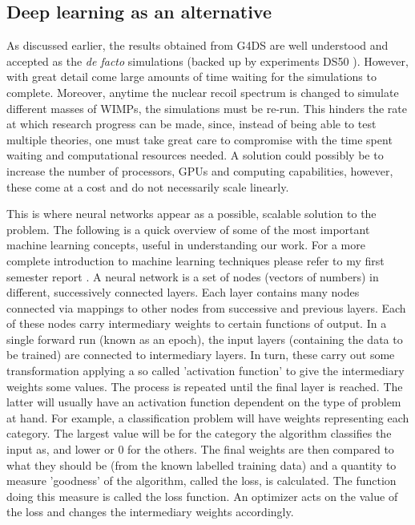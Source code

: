 \documentclass[11pt]{article} %
\begin{document}
\subsection{Deep learning as an alternative}
As discussed earlier, the results obtained from G4DS are well understood and accepted as the \textit{de facto} simulations (backed up by experiments DS50 \cite{agnes2015first}).
However, with great detail come large amounts of time waiting for the simulations to complete.
Moreover, anytime the nuclear recoil spectrum is changed to simulate different masses of WIMPs, the simulations must be re-run. This
 hinders the rate at which research progress can be made, since, instead of being able to test multiple theories,
  one must take great care to compromise with the time spent waiting and computational resources needed.
A solution could possibly be to increase the number of processors, GPUs and computing capabilities, however,
 these come at a cost and do not necessarily scale linearly.
\\
\par This is where neural networks appear as a possible, scalable solution to the problem.
The following is a quick overview of some of the most important machine learning concepts, useful in understanding our work.
For a more complete introduction to machine learning techniques please refer to my first semester report \cite{firstsemester}.
A neural network is a set of nodes (vectors of numbers) in different, successively connected layers.
Each layer contains many nodes connected via mappings to other nodes from successive and previous layers.
Each of these nodes carry intermediary weights to certain functions of output.
In a single forward run (known as an epoch), the input layers (containing the data to be trained) are connected to
intermediary layers.
In turn, these carry out some transformation applying a so called 'activation function' to give
the intermediary weights some values.
The process is repeated until the final layer is reached.
The latter will usually have an activation function dependent on the type of problem at hand.
For example, a classification problem will have weights representing each category.
The largest value will be for the category the algorithm classifies the input as, and lower or 0 for the others.
The final weights are then compared to what they should be (from the known labelled training data)
 and a quantity to measure 'goodness' of the algorithm, called the loss, is calculated.
The function doing this measure is called the loss function.
An optimizer acts on the value of the loss and changes the intermediary weights accordingly.
\end{document}
